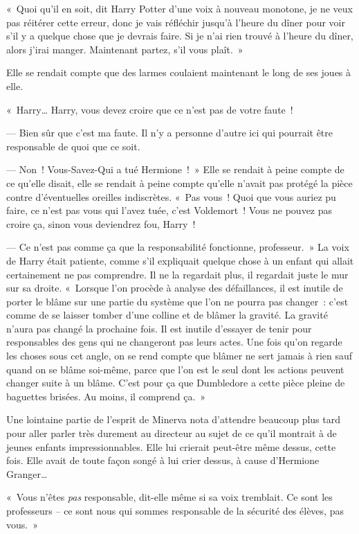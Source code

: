 «~Quoi qu'il en soit, dit Harry Potter d'une voix à nouveau monotone, je ne veux pas réitérer cette erreur, donc je vais réfléchir jusqu'à l'heure du dîner pour voir s'il y a quelque chose que je devrais faire. Si je n'ai rien trouvé à l'heure du dîner, alors j'irai manger. Maintenant partez, s'il vous plaît.~»

Elle se rendait compte que des larmes coulaient maintenant le long de ses joues à elle.

«~Harry… Harry, vous devez croire que ce n'est pas de votre faute~!

--- Bien sûr que c'est ma faute. Il n'y a personne d'autre ici qui pourrait être responsable de quoi que ce soit.

--- Non~! Vous-Savez-Qui a tué Hermione~!~» Elle se rendait à peine compte de ce qu'elle disait, elle se rendait à peine compte qu'elle n'avait pas protégé la pièce contre d'éventuelles oreilles indiscrètes. «~Pas vous~! Quoi que vous auriez pu faire, ce n'est pas vous qui l'avez tuée, c'est Voldemort~! Vous ne pouvez pas croire ça, sinon vous deviendrez fou, Harry~!

--- Ce n'est pas comme ça que la responsabilité fonctionne, professeur.~» La voix de Harry était patiente, comme s'il expliquait quelque chose à un enfant qui allait certainement ne pas comprendre. Il ne la regardait plus, il regardait juste le mur sur sa droite. «~Lorsque l'on procède à analyse des défaillances, il est inutile de porter le blâme sur une partie du système que l'on ne pourra pas changer~: c'est comme de se laisser tomber d'une colline et de blâmer la gravité. La gravité n'aura pas changé la prochaine fois. Il est inutile d'essayer de tenir pour responsables des gens qui ne changeront pas leurs actes. Une fois qu'on regarde les choses sous cet angle, on se rend compte que blâmer ne sert jamais à rien sauf quand on se blâme soi-même, parce que l'on est le seul dont les actions peuvent changer suite à un blâme. C'est pour ça que Dumbledore a cette pièce pleine de baguettes brisées. Au moins, il comprend ça.~»

Une lointaine partie de l'esprit de Minerva nota d'attendre beaucoup plus tard pour aller parler très durement au directeur au sujet de ce qu'il montrait à de jeunes enfants impressionnables. Elle lui crierait peut-être même dessus, cette fois. Elle avait de toute façon songé à lui crier dessus, à cause d'Hermione Granger…

«~Vous n'êtes \emph{pas} responsable, dit-elle même si sa voix tremblait. Ce sont les professeurs -- ce sont nous qui sommes responsable de la sécurité des élèves, pas vous.~»

